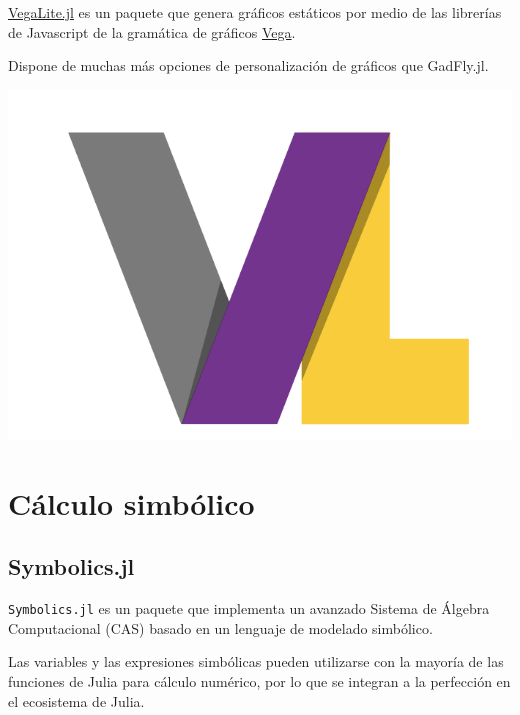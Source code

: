 \documentclass[
  letterpaper,
  DIV=11,
  numbers=noendperiod]{scrreprt}
\begin{document}
\href{https://www.queryverse.org/VegaLite.jl/stable/}{VegaLite.jl} es un
paquete que genera gráficos estáticos por medio de las librerías de
Javascript de la gramática de gráficos
\href{https://vega.github.io/}{Vega}.

Dispone de muchas más opciones de personalización de gráficos que
GadFly.jl.

\includegraphics{./img/logos/vega-little.png}


\hypertarget{cuxe1lculo-simbuxf3lico}{%
\chapter{Cálculo simbólico}\label{cuxe1lculo-simbuxf3lico}}

\hypertarget{symbolics.jl}{%
\section{Symbolics.jl}\label{symbolics.jl}}

\texttt{Symbolics.jl} es un paquete que implementa un avanzado Sistema
de Álgebra Computacional (CAS) basado en un lenguaje de modelado
simbólico.

Las variables y las expresiones simbólicas pueden utilizarse con la
mayoría de las funciones de Julia para cálculo numérico, por lo que se
integran a la perfección en el ecosistema de Julia.
\end{document}
